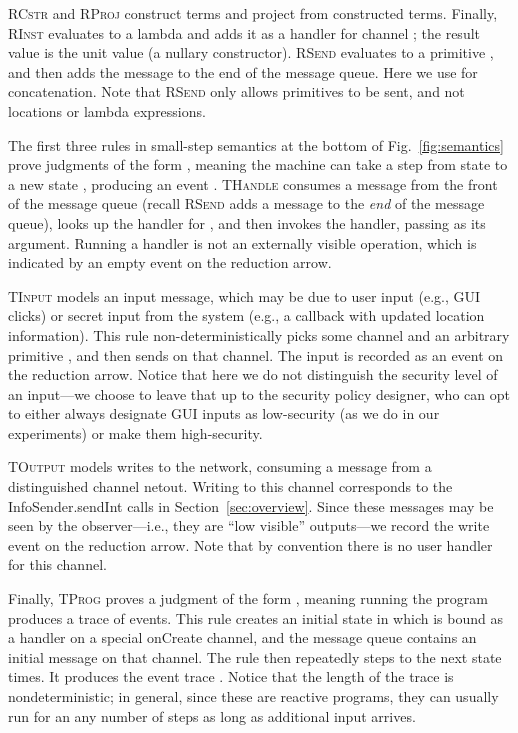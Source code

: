 \documentclass{llncs}
\newcommand{\code}[1]{\textsf{#1}} \newcommand{\bcode}[1]{\texttt{#1}}
\newcommand{\sfmt}[1]{\textsf{#1}}
\begin{document}
\textsc{RCstr} and \textsc{RProj} construct terms and project from
constructed terms. Finally, \textsc{RInst} evaluates  to a lambda
and adds it as a handler for channel ; the result value is the
unit value  (a nullary constructor). \textsc{RSend} evaluates
 to a primitive , and then adds the message  to the
end of the message queue. Here we use  for concatenation. Note that \textsc{RSend} only allows
primitives to be sent, and not locations or lambda
expressions.

The first three rules 
in small-step semantics at the bottom of
Fig.~\ref{fig:semantics} prove judgments of the form
, meaning the machine can take a step from state
 to a new state , producing an event .
\textsc{THandle} consumes a message  from the front of
the message queue (recall \textsc{RSend} adds a message to the
\emph{end}  of the message queue), looks up the handler for ,
and then invokes the handler, passing  as its argument. Running a
handler is not an externally visible operation, which is indicated by an empty
event  on the reduction arrow. 

\textsc{TInput} models an input message, which may be due to user
input (e.g., GUI clicks) or secret input from the system (e.g.,
a callback with updated location information). This rule
non-deterministically picks some channel  and an arbitrary
primitive , and then sends  on that channel. 
The input is recorded as an event on the reduction arrow.
Notice that here we do not distinguish the security level of an input---we choose to leave that
up to the security policy designer, who can opt to either always
designate GUI inputs as low-security (as we do in our experiments) or
make them high-security.

\textsc{TOutput} models writes to the network, consuming a message
from a distinguished channel \sfmt{netout}. Writing to this channel
corresponds to the \code{InfoSender.sendInt} calls in
Section~\ref{sec:overview}. Since these messages may be seen by the
observer---i.e., they are ``low visible'' outputs---we record the
write event on the reduction arrow. Note that by convention
there is no user handler for this channel.

Finally, \textsc{TProg} proves a judgment of the form
, meaning running the program  produces a
trace  of events.
This rule creates an initial state  in
which  is bound as a handler on a special \code{onCreate} channel,
and the message queue contains an initial message on that channel. The
rule then repeatedly steps to the next state  times. It produces 
the event trace .
Notice that the length of the trace  is nondeterministic; in general,
since these are reactive programs, they can usually run for an any
number of steps as long as additional input arrives.
\end{document}
